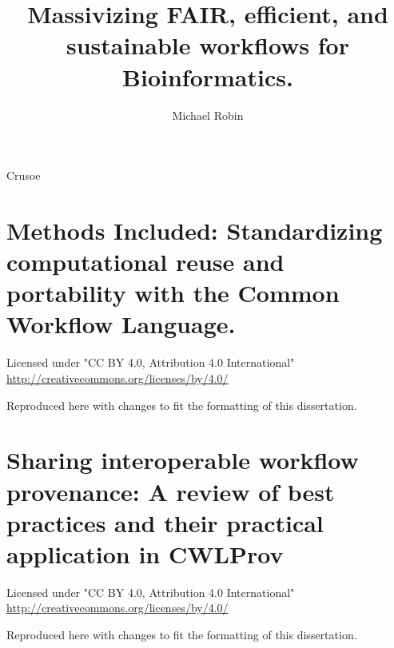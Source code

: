 \documentclass{dissertation}
\begin{document}
\title{Massivizing {FAIR,} {efficient,} and sustainable workflows for Bioinformatics.}
\author{Michael Robin}{Crusoe}

\frontmatter




\setcounter{tocdepth}{1}
\tableofcontents




\mainmatter

\thumbtrue

\nobibliography*



\chapter{Methods Included: Standardizing computational reuse and portability with the Common Workflow Language.}
\label{methods-included}


Licensed under "CC BY 4.0, Attribution 4.0 International" \url{http://creativecommons.org/licenses/by/4.0/}

Reproduced here with changes to fit the formatting of this dissertation.




\chapter{Sharing interoperable workflow provenance: A review of best practices and their practical application in CWLProv}
\label{cwlprov}

Licensed under "CC BY 4.0, Attribution 4.0 International" \url{http://creativecommons.org/licenses/by/4.0/}

Reproduced here with changes to fit the formatting of this dissertation.

\end{document}
